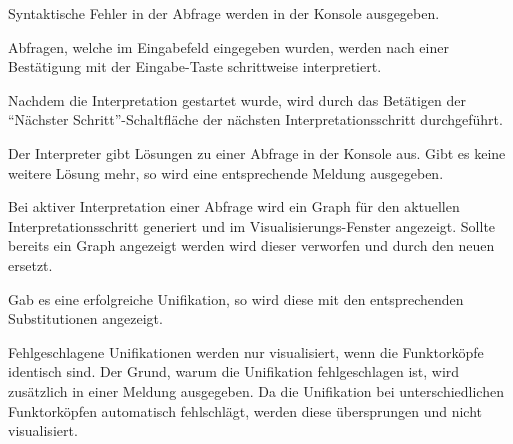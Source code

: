 \documentclass[parskip=full,11pt,twoside]{scrartcl}
\begin{document}

Syntaktische Fehler in der Abfrage werden in der Konsole ausgegeben.


Abfragen, welche im Eingabefeld eingegeben wurden, werden nach einer Bestätigung mit der Eingabe-Taste schrittweise interpretiert.


Nachdem die Interpretation gestartet wurde, wird durch das Betätigen der \enquote{Nächster Schritt}-Schaltfläche der nächsten Interpretationsschritt durchgeführt.


Der Interpreter gibt Lösungen zu einer Abfrage in der Konsole aus. Gibt es keine weitere Lösung mehr, so wird eine entsprechende Meldung ausgegeben.


Bei aktiver Interpretation einer Abfrage wird ein Graph für den aktuellen Interpretationsschritt generiert und im Visualisierungs-Fenster angezeigt. Sollte bereits ein Graph angezeigt werden wird dieser verworfen und durch den neuen ersetzt.


Gab es eine erfolgreiche Unifikation, so wird diese mit den entsprechenden Substitutionen angezeigt.


Fehlgeschlagene Unifikationen werden nur visualisiert, wenn die Funktorköpfe identisch sind. Der Grund, warum die Unifikation fehlgeschlagen ist, wird zusätzlich in einer Meldung ausgegeben. Da die Unifikation bei unterschiedlichen Funktorköpfen automatisch fehlschlägt, werden diese übersprungen und nicht visualisiert.

\end{document}

